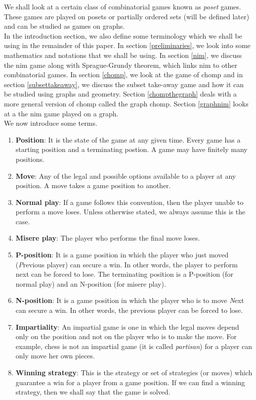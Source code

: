 \documentclass[a4paper, 12pt]{article}
\theoremstyle{remark} %
\begin{document}
We shall look at a certain class of combinatorial games known as \textit{poset} games. These games are played on posets or partially ordered sets (will be defined later) and can be studied as games on graphs.\\

In the introduction section, we also define some terminology which we shall be using in the remainder of this paper. In section \ref{preliminaries}, we look into some mathematics and notations that we shall be using. In section \ref{nim}, we discuss the nim game along with Sprague-Grundy theorem, which links nim to other combinatorial games. In section \ref{chomp}, we look at the game of chomp and in section \ref{subsettakeaway}, we discuss the subset take-away game and how it can be studied using graphs and geometry. Section \ref{chompthegraph} deals with a more general version of chomp called the graph chomp. Section \ref{graphnim} looks at a the nim game played on a graph.\\

\noindent We now introduce some terms.
\begin{enumerate}
	\item \textbf{Position}: It is the state of the game at any given time. Every game has a starting position and a terminating postion. A game may have finitely many positions.
	\item \textbf{Move}: Any of the legal and possible options available to a player at any position. A move takes a game position to another.
	\item \textbf{Normal play}: If a game follows this convention, then the player unable to perform a move loses. Unless otherwise stated, we always assume this is the case.
	\item \textbf{Misere play}: The player who performs the final move loses.
	\item \textbf{P-position}: It is a game position in which the player who just moved (\textit{P}revious player) can secure a win. In other words, the player to perform next can be forced to lose. The terminating position is a P-position (for normal play) and an N-position (for misere play).
	\item \textbf{N-position}: It is a game position in which the player who is to move \textit{N}ext can secure a win. In other words, the previous player can be forced to lose.
	\item \textbf{Impartiality}: An impartial game is one in which the legal moves depend only on the position and not on the player who is to make the move. For example, chess is not an impartial game (it is called \textit{partisan}) for a player can only move her own pieces.
	\item \textbf{Winning strategy}: This is the strategy or set of strategies (or moves) which guarantee a win for a player from a game position. If we can find a winning strategy, then we shall say that the game is solved.
\end{enumerate}
\end{document}
